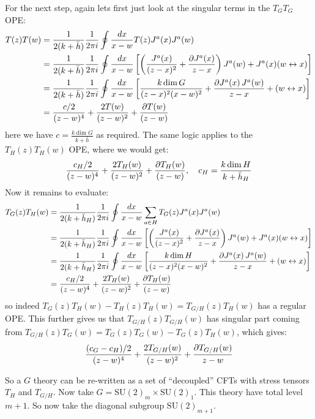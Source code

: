 \documentclass[11pt]{article}
\begin{document}
\begin{enumerate}
	For the next step, again lets first just look at the singular terms in the $T_G T_G$ OPE:
	\[
	\begin{aligned}
		T(z) T(w) &= \frac{1}{2 (k + \bar h)} \frac{1}{2\pi i} \oint \frac{dx}{x-w} T(z) J^a(x) J^a(w)\\
		&= \frac{1}{2 (k + \bar h)} \frac{1}{2\pi i} \oint \frac{dx}{x-w} \left[  \left(\frac{J^a(x)}{(z-x)^2} + \frac{\partial J^a(x)}{z-x} \right) J^a(w) + J^a(x) (w \leftrightarrow x) \right]\\
		&=  \frac{1}{2 (k + \bar h)} \frac{1}{2\pi i} \oint \frac{dx}{x-w} \left[ \frac{k \dim G}{(z-x)^2 (x-w)^2} + \frac{\partial J^a(x)\, J^a(w)}{z-x} + (w \leftrightarrow x) \right]\\
		&= \frac{c/2}{(z-w)^4} + \frac{2 T(w)}{(z-w)^2} + \frac{\partial T(w)}{(z-w)}
	\end{aligned}
	\]
	here we have $c = \frac{k \dim G}{k + \bar h}$ as required. The same logic applies to the $T_H(z) T_H(w)$ OPE, where we would get:
	\[
		\frac{c_H/2}{(z-w)^4} + \frac{2 T_H(w)}{(z-w)^2} + \frac{\partial T_H(w)}{(z-w)}, \quad c_H = \frac{k \dim H}{k + \bar h_H}
	\]
	Now it remains to evaluate:
	\[
	\begin{aligned}
		T_G(z) T_H(w) &= \frac{1}{2 (k + \bar h_H)} \frac{1}{2\pi i} \oint \frac{dx}{x-w} \sum_{a \in H} T_G(z) J^a(x) J^a(w)\\
		&= \frac{1}{2 (k + \bar h_H)} \frac{1}{2\pi i} \oint \frac{dx}{x-w} \left[  \left(\frac{J^a(x)}{(z-x)^2} + \frac{\partial J^a(x)}{z-x} \right) J^a(w) + J^a(x) (w \leftrightarrow x) \right]\\
		&=  \frac{1}{2 (k + \bar h_H)} \frac{1}{2\pi i} \oint \frac{dx}{x-w} \left[ \frac{k \dim H}{(z-x)^2 (x-w)^2} + \frac{\partial J^a(x)\, J^a(w)}{z-x} + (w \leftrightarrow x) \right]\\
		&= \frac{c_H/2}{(z-w)^4} + \frac{2 T_H(w)}{(z-w)^2} + \frac{\partial T_H(w)}{(z-w)}
	\end{aligned}
	\]
	so indeed $T_G(z) T_H(w) - T_H(z) T_H(w) = T_{G/H}(z) T_H(w)$ has a regular OPE. This further gives us that $T_{G/H}(z) T_{G/H}(w)$ has singular part coming from $T_{G/H}(z) T_G(w)= T_G(z) T_G(w) - T_G(z) T_H(w)$, which gives:
	\[
		\frac{(c_G-c_H)/2}{(z-w)^4} + \frac{2 T_{G/H}(w)}{(z-w)^2} + \frac{\partial T_{G/H}(w)}{z-w}
	\]
	
	So a $G$ theory can be re-written as a set of ``decoupled'' CFTs with stress tensors $T_H$ and $T_{G/H}$. Now take $G = \mathrm{SU}(2)_{m} \times \mathrm{SU}(2)_1$. This theory have total level $m+1$. So now take the diagonal subgroup $\mathrm{SU}(2)_{m+1}$.
	

\end{enumerate}
\end{document}
